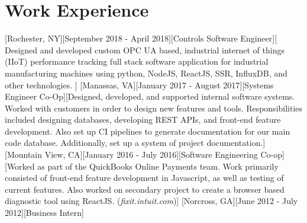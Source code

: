 \documentclass[showframe,showboundingboxes]{resume} %
\begin{document}
		\section{Work Experience}
		[Rochester, NY][September 2018 - April 2018][Controls Software Engineer][%
		Designed and developed custom OPC UA based, industrial internet of things (IIoT) performance tracking full stack software application for industrial manufacturing machines using python, NodeJS, ReactJS, SSR, InfluxDB, and other technologies.
		]%
		[Manassas, VA][January 2017 - August 2017][Systems Engineer Co-Op][Designed, developed, and supported internal software systems. Worked with customers in order to design new features and tools. Responsibilities included designing databases, developing REST APIs, and front-end feature development. Also set up CI pipelines to generate documentation for our main code database. Additionally, set up a system of project documentation.]%
		[Mountain View, CA][January 2016 - July 2016][Software Engineering Co-op][Worked as part of the QuickBooks Online Payments team. Work primarily consisted of front-end feature development in Javascript, as well as testing of current features. Also worked on secondary project to create a browser based diagnostic tool using ReactJS. ({\it fixit.intuit.com})]%
		[Norcross, GA][June 2012 - July 2012][Business Intern]%
\end{document}
